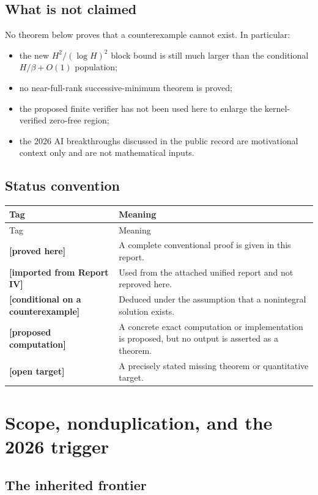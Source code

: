\documentclass[11pt,oneside]{article}
\theoremstyle{definition}
\theoremstyle{remark}
\newcommand{\statusproved}{\textcolor{provedgreen}{\textbf{[proved here]}}}
\newcommand{\statusconditional}{\textcolor{conditionalblue}{\textbf{[conditional on a counterexample]}}}
\newcommand{\statusopen}{\textcolor{opengray}{\textbf{[open target]}}}
\newcommand{\statuscompute}{\textcolor{computeviolet}{\textbf{[proposed computation]}}}
\newcommand{\statusimported}{\textcolor{conditionalblue}{\textbf{[imported from Report IV]}}}
\begin{document}
\subsection{What is not claimed}

No theorem below proves that a counterexample cannot exist.  In particular:

\begin{itemize}
\item the new $H^2/(\log H)^2$ block bound is still much larger than the conditional
$H/\beta+O(1)$ population;
\item no near-full-rank successive-minimum theorem is proved;
\item the proposed finite verifier has not been used here to enlarge the kernel-verified
zero-free region;
\item the 2026 AI breakthroughs discussed in the public record are motivational context only
and are not mathematical inputs.
\end{itemize}

\subsection{Status convention}

\begin{longtable}{p{}p{}}
\toprule
Tag & Meaning \\
\midrule
\endfirsthead
\toprule
Tag & Meaning \\
\midrule
\endhead
\statusproved & A complete conventional proof is given in this report. \\
\statusimported & Used from the attached unified report and not reproved here. \\
\statusconditional & Deduced under the assumption that a nonintegral solution exists. \\
\statuscompute & A concrete exact computation or implementation is proposed, but no output is
asserted as a theorem. \\
\statusopen & A precisely stated missing theorem or quantitative target. \\
\bottomrule
\end{longtable}

\section{Scope, nonduplication, and the 2026 trigger}

\subsection{The inherited frontier}
\end{document}
